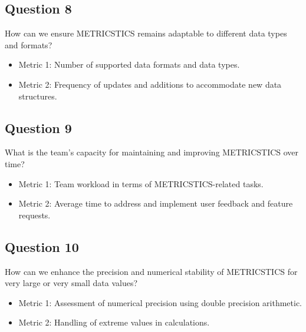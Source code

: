 \subsection*{Question 8}
How can we ensure METRICSTICS remains adaptable to different data types and formats?
\begin{itemize}
    \item Metric 1: Number of supported data formats and data types.
    \item Metric 2: Frequency of updates and additions to accommodate new data structures.
\end{itemize}

\subsection*{Question 9}
What is the team's capacity for maintaining and improving METRICSTICS over time?
\begin{itemize}
    \item Metric 1: Team workload in terms of METRICSTICS-related tasks.
    \item Metric 2: Average time to address and implement user feedback and feature requests.
\end{itemize}


\subsection*{Question 10}
How can we enhance the precision and numerical stability of METRICSTICS for very large or very small data values?
\begin{itemize}
    \item Metric 1: Assessment of numerical precision using double precision arithmetic.
    \item Metric 2: Handling of extreme values in calculations.
    
\end{itemize}